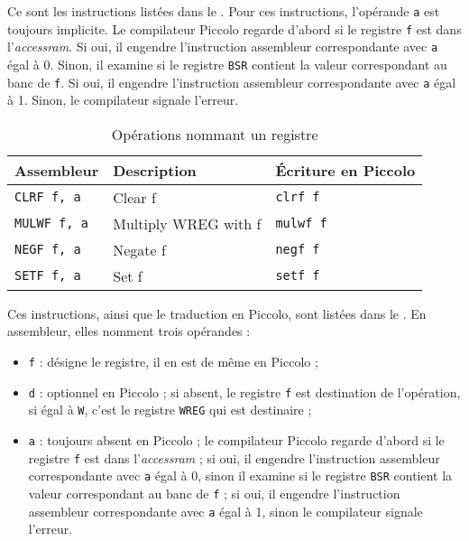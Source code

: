 


Ce sont les instructions listées dans le . Pour ces instructions, l'opérande \texttt{a} est toujours implicite. Le compilateur Piccolo regarde d'abord si le registre \texttt{f} est dans l'\emph{accessram}. Si oui, il engendre l'instruction assembleur correspondante avec \texttt{a} égal à 0. Sinon, il examine si le registre \texttt{BSR} contient la valeur correspondant au banc de \texttt{f}. Si oui, il engendre l'instruction assembleur correspondante avec \texttt{a} égal à 1. Sinon, le compilateur signale l'erreur.



\begin{table}[!ht]
  \centering
  \small
  \begin{tabular}{lll}
    \textbf{Assembleur} & \textbf{Description} & \textbf{Écriture en Piccolo}\\
    \hline
    \texttt{CLRF f, a} & Clear f & \texttt{clrf f} \\
    \texttt{MULWF f, a} & Multiply WREG with f & \texttt{mulwf f} \\
    \texttt{NEGF f, a} & Negate f & \texttt{negf f} \\
    \texttt{SETF f, a} & Set f & \texttt{setf f}\\
  \hline
  \end{tabular}
  \caption{Opérations nommant un registre}
\end{table}









Ces instructions, ainsi que le traduction en Piccolo, sont listées dans le . En assembleur, elles nomment trois opérandes :
\begin{itemize}
  \item \texttt{f} : désigne le registre, il en est de même en Piccolo ;
  \item \texttt{d} : optionnel en Piccolo ; si absent, le registre \texttt{f} est destination de l'opération, si égal à \texttt{W}, c'est le registre \texttt{WREG} qui est destinaire ;
  \item \texttt{a} : toujours absent en Piccolo ; le compilateur Piccolo regarde d'abord si le registre \texttt{f} est dans l'\emph{accessram} ; si oui, il engendre l'instruction assembleur correspondante avec \texttt{a} égal à 0, sinon il examine si le registre \texttt{BSR} contient la valeur correspondant au banc de \texttt{f} ; si oui, il engendre l'instruction assembleur correspondante avec \texttt{a} égal à 1, sinon le compilateur signale l'erreur.
\end{itemize}


